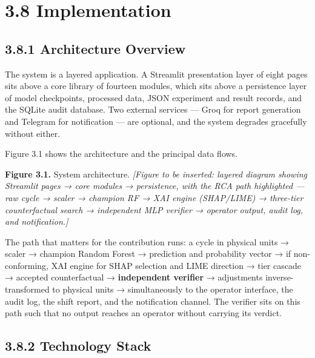 \hypertarget{implementation}{%
\section{3.8 Implementation}\label{implementation}}

\hypertarget{architecture-overview}{%
\subsection{3.8.1 Architecture Overview}\label{architecture-overview}}

The system is a layered application. A Streamlit presentation layer of eight pages sits above a core library of fourteen modules, which sits above a persistence layer of model checkpoints, processed data, JSON experiment and result records, and the SQLite audit database. Two external services --- Groq for report generation and Telegram for notification --- are optional, and the system degrades gracefully without either.

Figure 3.1 shows the architecture and the principal data flows.

\textbf{Figure 3.1.} System architecture. \emph{{[}Figure to be inserted: layered diagram showing Streamlit pages → core modules → persistence, with the RCA path highlighted --- raw cycle → scaler → champion RF → XAI engine (SHAP/LIME) → three-tier counterfactual search → independent MLP verifier → operator output, audit log, and notification.{]}}

The path that matters for the contribution runs: a cycle in physical units → scaler → champion Random Forest → prediction and probability vector → if non-conforming, XAI engine for SHAP selection and LIME direction → tier cascade → accepted counterfactual → \textbf{independent verifier} → adjustments inverse-transformed to physical units → simultaneously to the operator interface, the audit log, the shift report, and the notification channel. The verifier sits on this path such that no output reaches an operator without carrying its verdict.

\hypertarget{technology-stack}{%
\subsection{3.8.2 Technology Stack}\label{technology-stack}}

